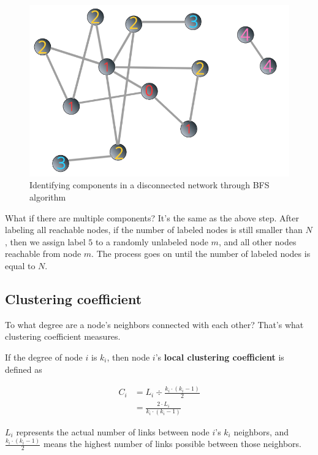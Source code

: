 \documentclass[
]{krantz}
\begin{document}
\begin{figure}

{\centering \includegraphics[width=0.65\linewidth]{images/bfsD3} 

}

\caption{Identifying components in a disconnected network through BFS algorithm}\label{fig:bfsD3}
\end{figure}

What if there are multiple components? It's the same as the above step. After labeling all reachable nodes, if the number of labeled nodes is still smaller than \(N\), then we assign label \(5\) to a randomly unlabeled node \(m\), and all other nodes reachable from node \(m\). The process goes on until the number of labeled nodes is equal to \(N\).

\hypertarget{clustering-coefficient}{%
\subsection{Clustering coefficient}\label{clustering-coefficient}}

To what degree are a node's neighbors connected with each other? That's what clustering coefficient measures.

If the degree of node \(i\) is \(k_i\), then node \(i\)'s \textbf{local clustering coefficient} is defined as

\begin{equation}
\begin{split}
  C_i & = L_i ÷ \frac{k_i \cdot (k_i - 1)}{2} \\
  & = \frac{2 \cdot L_i}{k_i \cdot (k_i - 1)}
\end{split}
\label{eq:localClustering}
\end{equation}

\(L_i\) represents the actual number of links between node \(i\)'s \(k_i\) neighbors, and \(\frac{k_i \cdot (k_i - 1)}{2}\) means the highest number of links possible between those neighbors.
\end{document}

